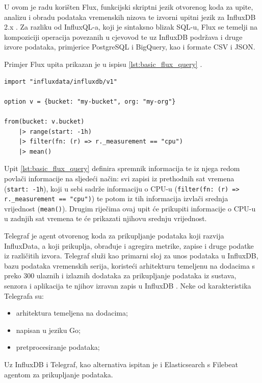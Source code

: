 U ovom je radu korišten Flux, funkcijski skriptni jezik otvorenog koda za upite, analizu i obradu podataka vremenskih nizova te izvorni upitni jezik za InfluxDB 2.x \cite{flux_getstarted, flux_basics_video}. 
Za razliku od InfluxQL-a, koji je sintaksno blizak SQL-u, Flux se temelji na kompoziciji operacija povezanih u cjevovod te uz InfluxDB podržava i druge izvore podataka, primjerice PostgreSQL i BigQuery, kao i 
formate CSV i JSON.

Primjer Flux upita prikazan je u ispisu \ref{lst:basic_flux_query} \cite{flux_query_basics}.
\begin{lstlisting}[caption={Primjer Flux upita}, label={lst:basic_flux_query}]
import "influxdata/influxdb/v1"

option v = {bucket: "my-bucket", org: "my-org"}

from(bucket: v.bucket)
    |> range(start: -1h)
    |> filter(fn: (r) => r._measurement == "cpu")
    |> mean()
\end{lstlisting}
Upit \ref{lst:basic_flux_query} definira spremnik informacija  te iz njega redom povlači informacije na sljedeći način: svi zapisi iz prethodnih sat vremena (\texttt{start: -1h}),
koji u sebi sadrže informaciju o CPU-u (\texttt{filter(fn: (r) => r.\_measurement == "cpu")}) te potom iz tih informacija izvlači srednja vrijednost (\texttt{mean()}). Drugim riječima ovaj upit će
prikupiti informacije o CPU-u u zadnjih sat vremena te će prikazati njihovu srednju vrijednost.

Telegraf je agent otvorenog koda za prikupljanje podataka koji razvija InfluxData, a koji prikuplja, obrađuje i agregira metrike, zapise i druge podatke iz različitih izvora. 
Telegraf služi kao primarni sloj za unos podataka u InfluxDB, bazu podataka vremenskih serija, koristeći arhitekturu temeljenu na dodacima s preko 300 ulaznih i izlaznih dodataka za prikupljanje 
podataka iz sustava, senzora i aplikacija te njihov izravan zapis u InfluxDB \cite{telegraf_docs}\cite{influxdb_telegraf_intro}.
Neke od karakteristika Telegrafa su:
\begin{itemize}
    \item arhitektura temeljena na dodacima;
    \item napisan u jeziku Go;
    \item pretprocesiranje podataka;
\end{itemize}

Uz InfluxDB i Telegraf, kao alternativa ispitan je i Elasticsearch s Filebeat agentom za prikupljanje podataka.

